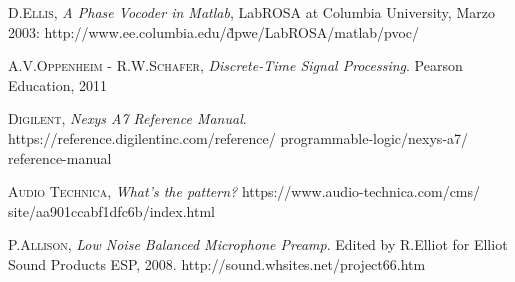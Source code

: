 \documentclass[a4paper, 11pt, oneside, openright]{report}
\begin{document}
\begin{thebibliography}{aaa}

	\textsc{D.Ellis},
	\textit{A Phase Vocoder in Matlab},
	LabROSA at Columbia University,
	Marzo 2003: 
	http://www.ee.columbia.edu/\~dpwe/LabROSA/matlab/pvoc/
	
	\textsc{A.V.Oppenheim - R.W.Schafer},
	\textit{Discrete-Time Signal Processing}.
	Pearson Education, 2011
	
	\textsc{Digilent},
	\textit{Nexys A7 Reference Manual}.
	https://reference.digilentinc.com/reference/ programmable-logic/nexys-a7/	  reference-manual
	
	\textsc{Audio Technica},
	\textit{What's the pattern?}
	https://www.audio-technica.com/cms/ site/aa901ccabf1dfc6b/index.html
	
	\textsc{P.Allison},
	\textit{Low Noise Balanced Microphone Preamp}.
	Edited by R.Elliot for	
	Elliot Sound Products ESP, 2008.
	http://sound.whsites.net/project66.htm
	
\end{thebibliography}
\end{document}
